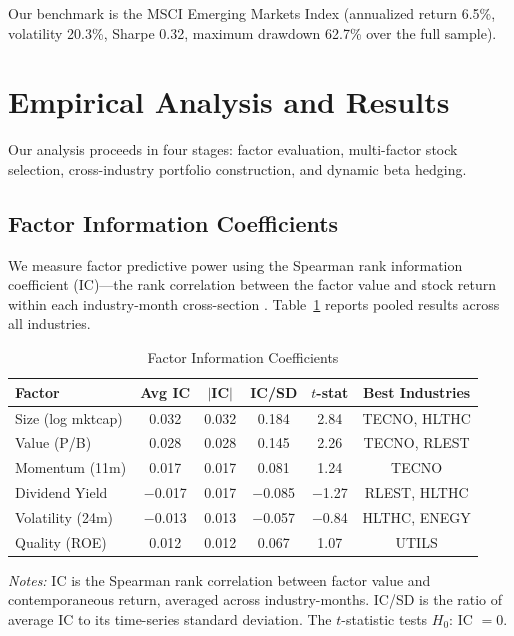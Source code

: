 \documentclass[12pt]{article}
\begin{document}
Our benchmark is the MSCI Emerging Markets Index (annualized return 6.5\%, volatility 20.3\%, Sharpe 0.32, maximum drawdown 62.7\% over the full sample).


\section{Empirical Analysis and Results}

Our analysis proceeds in four stages: factor evaluation, multi-factor stock selection, cross-industry portfolio construction, and dynamic beta hedging.

\subsection{Factor Information Coefficients}

We measure factor predictive power using the Spearman rank information coefficient (IC)---the rank correlation between the factor value and stock return within each industry-month cross-section \citep{grinold1989}. Table~\ref{tab:ic} reports pooled results across all industries.

\begin{table}[H]
\centering
\caption{Factor Information Coefficients}
\label{tab:ic}
\small
\begin{tabular}{lccccc}
\toprule
\textbf{Factor} & \textbf{Avg IC} & \textbf{$|$IC$|$} & \textbf{IC/SD} & \textbf{$t$-stat} & \textbf{Best Industries} \\
\midrule
Size (log mktcap)     &  0.032 & 0.032 & 0.184 & 2.84 & TECNO, HLTHC \\
Value (P/B)           &  0.028 & 0.028 & 0.145 & 2.26 & TECNO, RLEST \\
Momentum (11m)        &  0.017 & 0.017 & 0.081 & 1.24 & TECNO \\
Dividend Yield        & $-$0.017 & 0.017 & $-$0.085 & $-$1.27 & RLEST, HLTHC \\
Volatility (24m)      & $-$0.013 & 0.013 & $-$0.057 & $-$0.84 & HLTHC, ENEGY \\
Quality (ROE)         &  0.012 & 0.012 & 0.067 & 1.07 & UTILS \\
\bottomrule
\end{tabular}
\begin{minipage}{0.92\textwidth}
\vspace{0.3em}
\footnotesize
\textit{Notes:} IC is the Spearman rank correlation between factor value and contemporaneous return, averaged across industry-months. IC/SD is the ratio of average IC to its time-series standard deviation. The $t$-statistic tests $H_0$: IC $= 0$.
\end{minipage}
\end{table}
\end{document}
